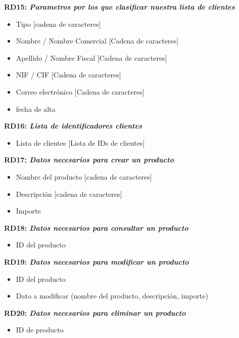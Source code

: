 \documentclass[paper=a4, fontsize=11pt, spanish]{scrartcl}
\begin{document}
\setlength{\parindent}{0em}
\textbf{RD15: \textit{Parametros por los que clasificar nuestra lista de clientes}}
\setlength{\parindent}{2em}
\begin{itemize}
\item Tipo [cadena de caracteres]
\item Nombre / Nombre Comercial [Cadena de caracteres]
\item Apellido / Nombre Fiscal [Cadena de caracteres]
\item NIF / CIF [Cadena de caracteres]
\item Correo electrónico [Cadena de caracteres]
\item fecha de alta
\end{itemize}

\setlength{\parindent}{0em}
\textbf{RD16: \textit{Lista de identificadores clientes}}
\setlength{\parindent}{2em}
\begin{itemize}
\item Lista de clientes [Lista de IDs de clientes]
\end{itemize}

\setlength{\parindent}{0em}
\textbf{RD17: \textit{Datos necesarios para crear un producto}}
\setlength{\parindent}{2em}
\begin{itemize}
  \item Nombre del producto [cadena de caracteres]
  \item Descripción [cadena de caracteres]
  \item Importe
\end{itemize}

\setlength{\parindent}{0em}
\textbf{RD18: \textit{Datos necesarios para consultar un producto}}
\setlength{\parindent}{2em}
\begin{itemize}
  \item ID del producto
\end{itemize}

\setlength{\parindent}{0em}
\textbf{RD19: \textit{Datos necesarios para modificar un producto}}
\setlength{\parindent}{2em}
\begin{itemize}
  \item ID del producto
  \item Dato a modificar (nombre del producto, descripción, importe)
\end{itemize}

\setlength{\parindent}{0em}
\textbf{RD20: \textit{Datos necesarios para eliminar un producto}}
\setlength{\parindent}{2em}
\begin{itemize}
  \item ID de producto
\end{itemize}
\end{document}
